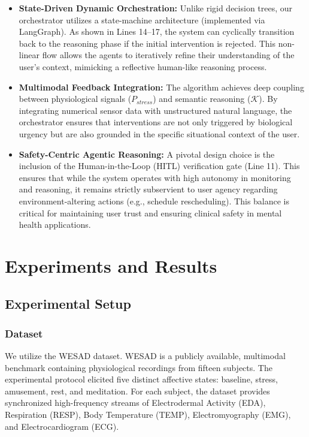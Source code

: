 \documentclass[journal,twoside,web]{ieeecolor}
\begin{document}
\begin{itemize}
    \item \textbf{State-Driven Dynamic Orchestration:} Unlike rigid decision trees, our orchestrator utilizes a state-machine architecture (implemented via LangGraph). As shown in Lines 14--17, the system can cyclically transition back to the reasoning phase if the initial intervention is rejected. This non-linear flow allows the agents to iteratively refine their understanding of the user’s context, mimicking a reflective human-like reasoning process.
    
    \item \textbf{Multimodal Feedback Integration:} The algorithm achieves deep coupling between physiological signals ($P_{stress}$) and semantic reasoning ($\mathcal{K}$). By integrating numerical sensor data with unstructured natural language, the orchestrator ensures that interventions are not only triggered by biological urgency but are also grounded in the specific situational context of the user.
    
    \item \textbf{Safety-Centric Agentic Reasoning:} A pivotal design choice is the inclusion of the Human-in-the-Loop (HITL) verification gate (Line 11). This ensures that while the system operates with high autonomy in monitoring and reasoning, it remains strictly subservient to user agency regarding environment-altering actions (e.g., schedule rescheduling). This balance is critical for maintaining user trust and ensuring clinical safety in mental health applications.
\end{itemize}


\section{Experiments and Results}
\label{sec:guidelines}
\subsection{Experimental Setup}
\subsubsection{Dataset} We utilize the WESAD  dataset. WESAD is a publicly available, multimodal benchmark containing physiological recordings from fifteen subjects. The experimental protocol elicited five distinct affective states: baseline, stress, amusement, rest, and meditation. For each subject, the dataset provides synchronized high-frequency streams of Electrodermal Activity (EDA), Respiration (RESP), Body Temperature (TEMP), Electromyography (EMG), and Electrocardiogram (ECG).
\end{document}
